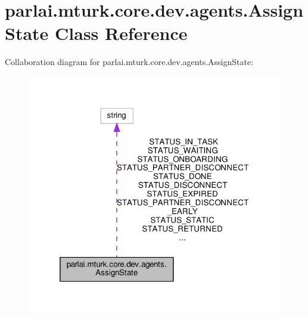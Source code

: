 \hypertarget{classparlai_1_1mturk_1_1core_1_1dev_1_1agents_1_1AssignState}{}\section{parlai.\+mturk.\+core.\+dev.\+agents.\+Assign\+State Class Reference}
\label{classparlai_1_1mturk_1_1core_1_1dev_1_1agents_1_1AssignState}


Collaboration diagram for parlai.\+mturk.\+core.\+dev.\+agents.\+Assign\+State\+:
\nopagebreak
\begin{figure}[H]
\begin{center}
\leavevmode
\includegraphics[width=319pt]{classparlai_1_1mturk_1_1core_1_1dev_1_1agents_1_1AssignState__coll__graph}
\end{center}
\end{figure}
